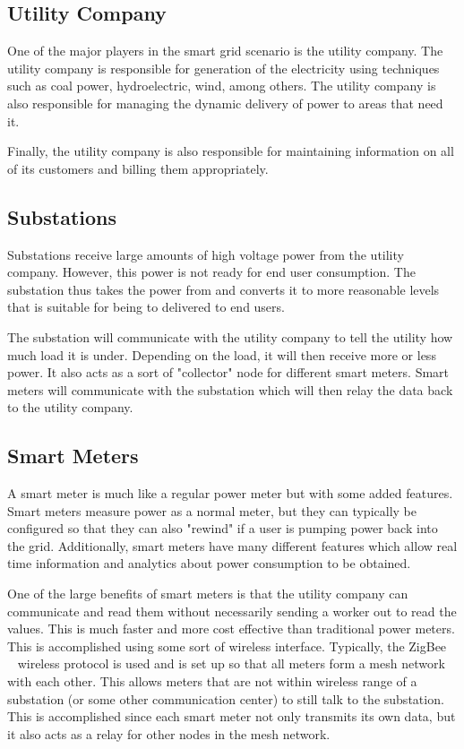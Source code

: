 \subsection{Utility Company}
One of the major players in the smart grid scenario is the utility company. The utility company is responsible for
generation of the electricity using techniques such as coal power, hydroelectric, wind, among others. The utility
company is also responsible for managing the dynamic delivery of power to areas that need it.

Finally, the utility company is also responsible for maintaining information on all of its customers and billing them
appropriately.

\subsection{Substations}
Substations receive large amounts of high voltage power from the utility company. However, this power is not ready
for end user consumption. The substation thus takes the power from and converts it to  more reasonable levels
that is suitable for being to delivered to end users.

The substation will communicate with the utility company to tell the utility how much load it is under. Depending on
the load, it will then receive more or less power. It also acts as a sort of "collector" node for different smart meters.
Smart meters will communicate with the substation which will then relay the data back to the utility company.

\subsection{Smart Meters}
A smart meter is much like a regular power meter but with some added features. Smart meters measure power as
a normal meter, but they can typically be configured so that they can also "rewind" if a user is pumping power back
into the grid. Additionally, smart meters have many different features which allow real time information and analytics
about power consumption to be obtained.

One of the large benefits of smart meters is that the utility company can communicate and read them without
necessarily sending a worker out to read the values. This is much faster and more cost effective than traditional
power meters. This is accomplished using some sort of wireless interface. Typically, the ZigBee~\cite{zigbee}
~\cite{aminetworking}
wireless protocol is used and is set up so that all meters form a mesh network with each other. This allows meters
that are not within wireless range of a substation (or some other communication center) to still talk to the substation.
This is accomplished since each smart meter not only transmits its own data, but it also acts as a relay for other nodes
in the mesh network.


